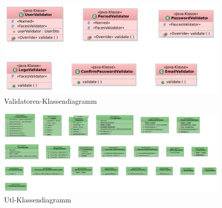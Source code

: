 \documentclass{article}
\begin{document}
\begin{figure}[H]
    \includegraphics[scale=0.4]{Validatorendiagramm.pdf}
    \caption{Validatoren-Klassendiagramm}
    \label{fig:UML-Klassendkígrramm}
\end{figure}

\begin{figure}[H]
\hypertarget{Logger}{}
    \includegraphics[scale=0.3]{Utildiagramm.pdf}
    \caption{Utl-Klassendiagramm}
    \label{fig:UML-Klassendkígrramm}
\end{figure}
\end{document}
